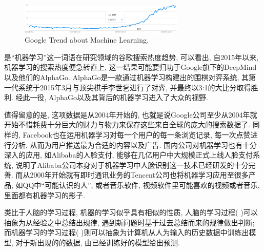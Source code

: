 \documentclass[lang=cn,11pt,a4paper]{elegantpaper}
\begin{document}
\begin{figure}[htbp]
	\centering
	\includegraphics[width=0.7\textwidth]{GoogleTrend}
  	\caption{Google Trend about Machine Learning.\label{fig:GoogleTrend}}
\end{figure}
\par {} 是“机器学习”这一词语在研究领域的谷歌搜索热度趋势\cite{GT}, 可以看出, 自2015年以来, 机器学习的搜索热度便急转直上, 这一结果可能要归功于Google旗下的DeepMind以及他们的AlphaGo. AlphaGo是一款通过机器学习构建出的围棋对弈系统, 其第一代系统于2015年3月与顶尖棋手李世乭进行了对弈, 并最终以3:1的大比分取得胜利. 经此一役, AlphaGo以及其背后的机器学习进入了大众的视野. 
\par 值得留意的是, 这项数据是从2004年开始的, 也就是说Google公司至少从2004年就开始不惜耗费十分巨大的财力与物力来保存这些来自全球的庞大的搜索数据了. 同样的, Facebook也在运用机器学习对每一个用户的每一条浏览记录, 每一次点赞进行分析, 从而为用户推送最为合适的内容以及广告. 国内公司对机器学习也有十分深入的应用, 如Alibaba的人脸支付, 能够在几亿用户中大规模正式上线人脸支付系统, 说明了Alibaba公司本身对于机器学习中人脸识别这一技术已经研发的十分完善. 而从2000年开始就有即时通讯业务的Tencent公司也将机器学习应用至很多产品, 如QQ中“可能认识的人”, 或者音乐软件, 视频软件里可能喜欢的视频或者音乐, 里面都有机器学习的影子.
\par 类比于人脑的学习过程, 机器的学习似乎具有相似的性质, 人脑的学习过程( )可以抽象为从经验之中总结出规律, 遇到新问题时基于过去总结而来的规律做出判断; 而机器学习的学习过程( )则可以抽象为计算机从人为输入的历史数据中训练出模型, 对于新出现的的数据, 由已经训练好的模型给出预测. 
\end{document}
